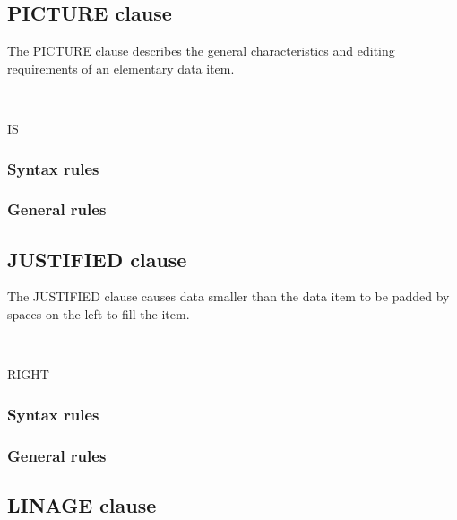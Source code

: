 \subsection{PICTURE clause}

The PICTURE clause describes the general characteristics and editing requirements of an elementary data item.

\begin{syntax}
  \begin{1=}
     \\
  \end{1=}
  IS 
\end{syntax}

\subsubsection{Syntax rules}

\subsubsection{General rules}

\subsection{JUSTIFIED clause}

The JUSTIFIED clause causes data smaller than the data item to be padded by spaces on the left to fill the item.

\begin{syntax}
  \begin{1=}
     \\
  \end{1=}
  RIGHT
\end{syntax}

\subsubsection{Syntax rules}

\subsubsection{General rules}

\subsection{LINAGE clause}

